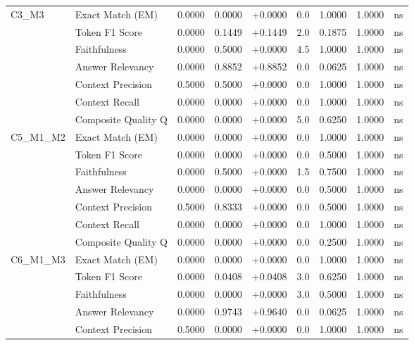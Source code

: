 \begin{table}[p]
\begin{tabular*}{\textwidth}{@{\extracolsep{\fill}} l l r r r r r r c @{}}
\addlinespace
C3\_M3          & Exact Match (EM)    & 0.0000 & 0.0000 & +0.0000 & 0.0 & 1.0000 & 1.0000 & ns \\
               & Token F1 Score      & 0.0000 & 0.1449 & +0.1449 & 2.0 & 0.1875 & 1.0000 & ns \\
               & Faithfulness        & 0.0000 & 0.5000 & +0.0000 & 4.5 & 1.0000 & 1.0000 & ns \\
               & Answer Relevancy    & 0.0000 & 0.8852 & +0.8852 & 0.0 & 0.0625 & 1.0000 & ns \\
               & Context Precision   & 0.5000 & 0.5000 & +0.0000 & 0.0 & 1.0000 & 1.0000 & ns \\
               & Context Recall      & 0.0000 & 0.0000 & +0.0000 & 0.0 & 1.0000 & 1.0000 & ns \\
               & Composite Quality Q & 0.0000 & 0.0000 & +0.0000 & 5.0 & 0.6250 & 1.0000 & ns \\
\addlinespace
C5\_M1\_M2      & Exact Match (EM)    & 0.0000 & 0.0000 & +0.0000 & 0.0 & 1.0000 & 1.0000 & ns \\
               & Token F1 Score      & 0.0000 & 0.0000 & +0.0000 & 0.0 & 0.5000 & 1.0000 & ns \\
               & Faithfulness        & 0.0000 & 0.5000 & +0.0000 & 1.5 & 0.7500 & 1.0000 & ns \\
               & Answer Relevancy    & 0.0000 & 0.0000 & +0.0000 & 0.0 & 0.5000 & 1.0000 & ns \\
               & Context Precision   & 0.5000 & 0.8333 & +0.0000 & 0.0 & 0.5000 & 1.0000 & ns \\
               & Context Recall      & 0.0000 & 0.0000 & +0.0000 & 0.0 & 1.0000 & 1.0000 & ns \\
               & Composite Quality Q & 0.0000 & 0.0000 & +0.0000 & 0.0 & 0.2500 & 1.0000 & ns \\
\addlinespace
C6\_M1\_M3      & Exact Match (EM)    & 0.0000 & 0.0000 & +0.0000 & 0.0 & 1.0000 & 1.0000 & ns \\
               & Token F1 Score      & 0.0000 & 0.0408 & +0.0408 & 3.0 & 0.6250 & 1.0000 & ns \\
               & Faithfulness        & 0.0000 & 0.0000 & +0.0000 & 3.0 & 0.5000 & 1.0000 & ns \\
               & Answer Relevancy    & 0.0000 & 0.9743 & +0.9640 & 0.0 & 0.0625 & 1.0000 & ns \\
               & Context Precision   & 0.5000 & 0.0000 & +0.0000 & 0.0 & 1.0000 & 1.0000 & ns \\

\end{tabular*}
\end{table}
